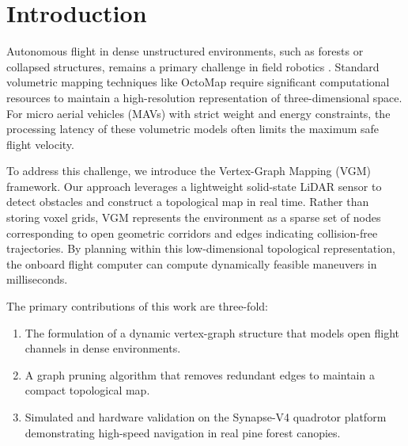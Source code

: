 \section{Introduction}
Autonomous flight in dense unstructured environments, such as forests or collapsed structures, remains a primary challenge in field robotics \cite{chen2021uav}. Standard volumetric mapping techniques like OctoMap \cite{nimbus2021octomap} require significant computational resources to maintain a high-resolution representation of three-dimensional space. For micro aerial vehicles (MAVs) with strict weight and energy constraints, the processing latency of these volumetric models often limits the maximum safe flight velocity.

To address this challenge, we introduce the Vertex-Graph Mapping (VGM) framework. Our approach leverages a lightweight solid-state LiDAR sensor to detect obstacles and construct a topological map in real time. Rather than storing voxel grids, VGM represents the environment as a sparse set of nodes corresponding to open geometric corridors and edges indicating collision-free trajectories. By planning within this low-dimensional topological representation, the onboard flight computer can compute dynamically feasible maneuvers in milliseconds.

The primary contributions of this work are three-fold:
\begin{enumerate}
  \item The formulation of a dynamic vertex-graph structure that models open flight channels in dense environments.
  \item A graph pruning algorithm that removes redundant edges to maintain a compact topological map.
  \item Simulated and hardware validation on the Synapse-V4 quadrotor platform demonstrating high-speed navigation in real pine forest canopies.
\end{enumerate}
